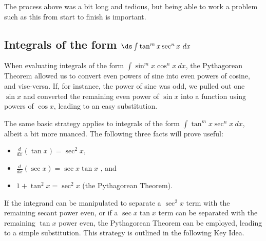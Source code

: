 The process above was a bit long and tedious, but being able to work a problem such as this from start to finish is important.

\subsection{\texorpdfstring{Integrals of the form $\ds\int\tan^mx\sec^nx\ dx$}{Integrands of the form (tan x)\^{}m (sec x)\^{}n}}

When evaluating integrals of the form $\int \sin^mx\cos^nx\ dx$, the Pythagorean Theorem allowed us to convert even powers of sine into even powers of cosine, and vise-versa. If, for instance, the power of sine was odd, we pulled out one $\sin x$ and converted the remaining even power of $\sin x$ into a function using powers of $\cos x$, leading to an easy substitution.

The same basic strategy applies to integrals of the form $\int \tan^mx\sec^n x\ dx$, albeit a bit more nuanced. The following three facts will prove useful:
\begin{itemize}
\item $\frac{d}{dx}(\tan x) = \sec^2x$, 
\item $\frac{d}{dx}(\sec x) = \sec x\tan x$ , and 
\item	$1+\tan^2x = \sec^2x$ (the Pythagorean Theorem).
\end{itemize}

If the integrand can be manipulated to separate a $\sec^2x$ term with the remaining secant power even, or if a $\sec x\tan x$ term can be separated with the remaining $\tan x$ power even, the Pythagorean Theorem can be employed, leading to a simple substitution. This strategy is outlined in the following Key Idea.


